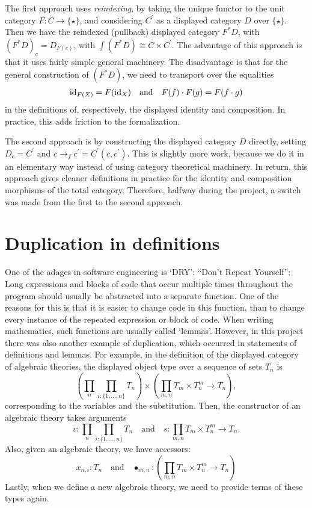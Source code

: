 The first approach uses \textit{reindexing}, by taking the unique functor to the unit category $ F : C \to \{ \star \} $, and considering $ C^\prime $ as a displayed category $ D $ over $ \{ \star \} $. Then we have the reindexed (pullback) displayed category $ F^* D $, with $ (F^* D)_c = D_{F(c)} $, with $ \int (F^* D) \cong C \times C^\prime $. The advantage of this approach is that it uses fairly simple general machinery. The disadvantage is that for the general construction of $ (F^* D) $, we need to transport over the equalities
\[ \text{id}_{F(X)} = F(\text{id}_{X}) \quad \text{and} \quad F(f) \cdot F(g) = F(f \cdot g) \]
in the definitions of, respectively, the displayed identity and composition. In practice, this adds friction to the formalization.

The second approach is by constructing the displayed category $ D $ directly, setting $ D_c = C^\prime $ and $ c \to_f c^\prime = C^\prime(c, c^\prime) $. This is slightly more work, because we do it in an elementary way instead of using category theoretical machinery. In return, this approach gives cleaner definitions in practice for the identity and composition morphisms of the total category. Therefore, halfway during the project, a switch was made from the first to the second approach.

\section{Duplication in definitions}
One of the adages in software engineering is `DRY': ``Don't Repeat Yourself'': Long expressions and blocks of code that occur multiple times throughout the program should usually be abstracted into a separate function. One of the reasons for this is that it is easier to change code in this function, than to change every instance of the repeated expression or block of code. When writing mathematics, such functions are usually called `lemmas'. However, in this project there was also another example of duplication, which occurred in statements of definitions and lemmas. For example, in the definition of the displayed category of algebraic theories, the displayed object type over a sequence of sets $ T_n $ is
\[ \left(\prod_n \prod_{i : \{ 1, \dots, n \}} T_n \right) \times \left( \prod_{m, n} T_m \times T_n^m \to T_n \right), \]
corresponding to the variables and the substitution. Then, the constructor of an algebraic theory takes arguments
\[ v : \prod_n \prod_{i : \{ 1, \dots, n \}} T_n \quad \text{and} \quad s : \prod_{m, n} T_m \times T_n^m \to T_n. \]
Also, given an algebraic theory, we have accessors:
\[ x_{n, i} : T_n \quad \text{and} \quad \bullet_{m, n} : (\prod_{m, n} T_m \times T_n^m \to T_n) \]
Lastly, when we define a new algebraic theory, we need to provide terms of these types again.

